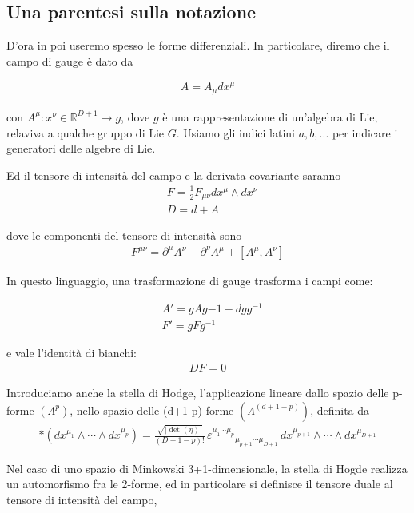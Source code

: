 \documentclass{report}
\begin{document}
\subsection{Una parentesi sulla notazione}

D'ora in poi useremo spesso le forme differenziali. In particolare, diremo che il campo di gauge è dato da 

\begin{align}
    A = A_\mu dx^\mu
\end{align}

con \(A^\mu : x^{\nu} \in \mathbb{R}^{D+1} \rightarrow g\), dove \(g\) è una rappresentazione di un'algebra di Lie, relaviva a qualche gruppo di Lie \(G\). Usiamo gli indici latini \(a, b, ...\) per indicare i generatori delle algebre di Lie.   

Ed il tensore di intensità del campo e la derivata covariante saranno
\begin{align}
    &F = \frac{1}{2}F_{\mu\nu} dx^{\mu} \wedge dx^{\nu} \\
    &D = d + A
\end{align}


dove le componenti del tensore di intensità sono
\begin{align}
    F^{\mu\nu} = \partial^\mu A^\nu - \partial^\nu A^\mu + [A^\mu, A^\nu]
\end{align}

In questo linguaggio, una trasformazione di gauge trasforma i campi come: 

\begin{align}
    &A' = gAg{-1} - dg g^{-1} \\
    &F' = gFg^{-1}
\end{align}

e vale l'identità di bianchi: 
\begin{align}
    DF = 0
\end{align}

Introduciamo anche la stella di Hodge, l'applicazione lineare dallo spazio delle p-forme \((\Lambda^p)\), nello spazio delle (d+1-p)-forme \((\Lambda^{(d+1-p)})\), definita da 
\begin{align}
    *(dx^{\mu_1} \wedge \cdots \wedge dx^{\mu_p})
= \frac{\sqrt{|\det(\eta)|}}{(D+1-p)!}\,
\varepsilon^{\mu_1 \cdots \mu_p}{}_{\mu_{p+1} \cdots \mu_{D+1}}\,
dx^{\mu_{p+1}} \wedge \cdots \wedge dx^{\mu_{D+1}}
\end{align}

Nel caso di uno spazio di Minkowski 3+1-dimensionale, la stella di Hogde realizza un automorfismo fra le 2-forme, ed in particolare si definisce il tensore duale al tensore di intensità del campo, 
\end{document}
